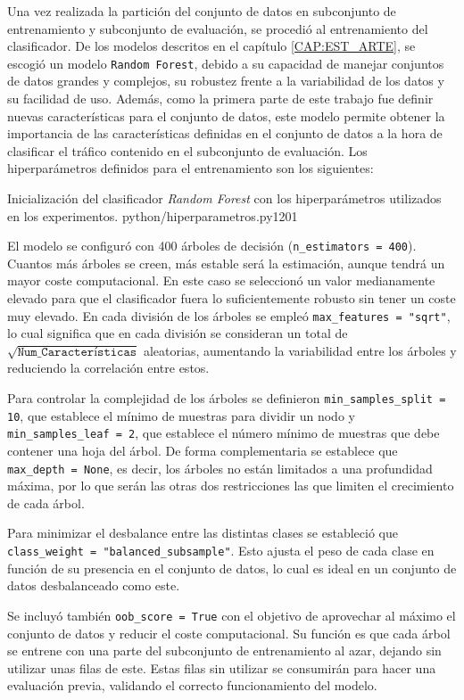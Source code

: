 Una vez realizada la partición del conjunto de datos en subconjunto de entrenamiento y subconjunto de evaluación, se procedió al entrenamiento del clasificador. De los modelos descritos en el capítulo \ref{CAP:EST_ARTE}, se escogió un modelo \texttt{Random Forest}, debido a su capacidad de manejar conjuntos de datos grandes y complejos, su robustez frente a la variabilidad de los datos y su facilidad de uso. Además, como la primera parte de este trabajo fue definir nuevas características para el conjunto de datos, este modelo permite obtener la importancia de las características definidas en el conjunto de datos a la hora de clasificar el tráfico contenido en el subconjunto de evaluación. Los hiperparámetros definidos para el entrenamiento son los siguientes:

{Inicialización del clasificador \textit{Random Forest} con los hiperparámetros utilizados en los experimentos.}
{python/hiperparametros.py}{1}{20}{1}

El modelo se configuró con 400 árboles de decisión (\texttt{n\_estimators = 400}). Cuantos más árboles se creen, más estable será la estimación, aunque tendrá un mayor coste computacional. En este caso se seleccionó un valor medianamente elevado para que el clasificador fuera lo suficientemente robusto sin tener un coste muy elevado. En cada división de los árboles se empleó \texttt{max\_features = "sqrt"}, lo cual significa que en cada división se consideran un total de $\sqrt{\texttt{Num\_Características}}$ aleatorias, aumentando la variabilidad entre los árboles y reduciendo la correlación entre estos. 

Para controlar la complejidad de los árboles se definieron \texttt{min\_samples\_split = 10}, que establece el mínimo de muestras para dividir un nodo y \texttt{min\_samples\_leaf = 2}, que establece el número mínimo de muestras que debe contener una hoja del árbol. De forma complementaria se establece que \texttt{max\_depth = None}, es decir, los árboles no están limitados a una profundidad máxima, por lo que serán las otras dos restricciones las que limiten el crecimiento de cada árbol.

Para minimizar el desbalance entre las distintas clases se estableció que \texttt{class\_weight = "balanced\_subsample"}. Esto ajusta el peso de cada clase en función de su presencia en el conjunto de datos, lo cual es ideal en un conjunto de datos desbalanceado como este. 

Se incluyó también \texttt{oob\_score = True} con el objetivo de aprovechar al máximo el conjunto de datos y reducir el coste computacional. Su función es que cada árbol se entrene con una parte del subconjunto de entrenamiento al azar, dejando sin utilizar unas filas de este. Estas filas sin utilizar se consumirán para hacer una evaluación previa, validando el correcto funcionamiento del modelo.

